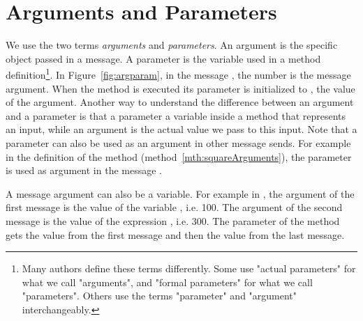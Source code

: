 \section{Arguments and Parameters} 
We use the two terms \emph{arguments} and \emph{parameters}\newcommand{\add}[1]{ for related but different ideas}.  An argument is the \newcommand{\replace}[2]{actual}{specific} object passed in a message\newcommand{\replace}[2]{, while a}{. A} parameter is the variable used in \newcommand{\replace}[2]{the}{a} method definition\newcommand{\add}[1]{, whose precise value isn't known when the method is defined}\footnote{\newcommand{\replace}[2]{Other authors call argument actual parameters and parameters formal parameters, others use parameter and argument interchangeably.}{Many authors define these terms differently. Some use "actual parameters" for what we call "arguments", and "formal parameters" for what we call "parameters". Others use the terms "parameter" and "argument" interchangeably.}}. \newcommand{\add}[1]{\paragraph
}
In Figure~\ref{fig:argparam}, in the message , the number  is the message argument. When the method  is executed its parameter  is initialized to , the value of the argument. \newcommand{\add}[1]{\paragraph
}
Another way to understand the difference between an argument and a parameter is that a parameter \newcommand{\add}[1]{is} a variable inside a method \newcommand{\replace}[2]{representing}{that represents} an input\newcommand{\add}[1]{ to the method}, while an argument is the actual value we pass to this input. \newcommand{\add}[1]{\paragraph
}
Note that a parameter can also be used as an argument \newcommand{\replace}[2]{to}{in} other message sends. For example in the definition of the method  (method~\ref{mth:squareArguments}), the parameter  is used as \newcommand{\add}[1]{the} argument in the message .



A message argument can \newcommand{\replace}[2]{be also}{also be} a variable. For example in , the argument of the first message  is the value of the variable , \newcommand{\replace}[2]{\ie}{i.e.} 100. The argument of the second message  is the value of the expression \newcommand{\replace}[2]{ \ie}{, i.e.} 300. The parameter  of the method  \newcommand{\replace}[2]{will then takes}{gets} the value  \newcommand{\replace}[2]{for}{from} the first message\newcommand{\add}[1]{,} and then the value  \newcommand{\replace}[2]{for}{from} the last message\newcommand{\remove}[1]{ send}. 


